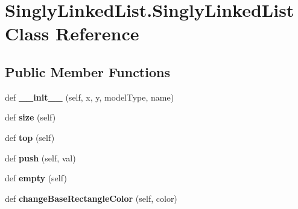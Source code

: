 \hypertarget{class_singly_linked_list_1_1_singly_linked_list}{}\section{Singly\+Linked\+List.\+Singly\+Linked\+List Class Reference}
\label{class_singly_linked_list_1_1_singly_linked_list}
\subsection*{Public Member Functions}
\begin{DoxyCompactItemize}
\item 
def {\bfseries \+\_\+\+\_\+init\+\_\+\+\_\+} (self, x, y, model\+Type, name)\hypertarget{class_singly_linked_list_1_1_singly_linked_list_a2e508ae2b37528ee587753422068f144}{}\label{class_singly_linked_list_1_1_singly_linked_list_a2e508ae2b37528ee587753422068f144}

\item 
def {\bfseries size} (self)\hypertarget{class_singly_linked_list_1_1_singly_linked_list_a96f6f50cf9bed918fe1f5248c1649f0c}{}\label{class_singly_linked_list_1_1_singly_linked_list_a96f6f50cf9bed918fe1f5248c1649f0c}

\item 
def {\bfseries top} (self)\hypertarget{class_singly_linked_list_1_1_singly_linked_list_af6f27944245081ce67217ffc2a875a76}{}\label{class_singly_linked_list_1_1_singly_linked_list_af6f27944245081ce67217ffc2a875a76}

\item 
def {\bfseries push} (self, val)\hypertarget{class_singly_linked_list_1_1_singly_linked_list_a7e948d77c8c645f33f4fea05844e7a76}{}\label{class_singly_linked_list_1_1_singly_linked_list_a7e948d77c8c645f33f4fea05844e7a76}

\item 
def {\bfseries empty} (self)\hypertarget{class_singly_linked_list_1_1_singly_linked_list_a724e0a860fe1047e11c285dc533f567c}{}\label{class_singly_linked_list_1_1_singly_linked_list_a724e0a860fe1047e11c285dc533f567c}

\item 
def {\bfseries change\+Base\+Rectangle\+Color} (self, color)\hypertarget{class_singly_linked_list_1_1_singly_linked_list_a83ac65fabad4d24148ee485a8c4f372f}{}\label{class_singly_linked_list_1_1_singly_linked_list_a83ac65fabad4d24148ee485a8c4f372f}


\end{DoxyCompactItemize}
